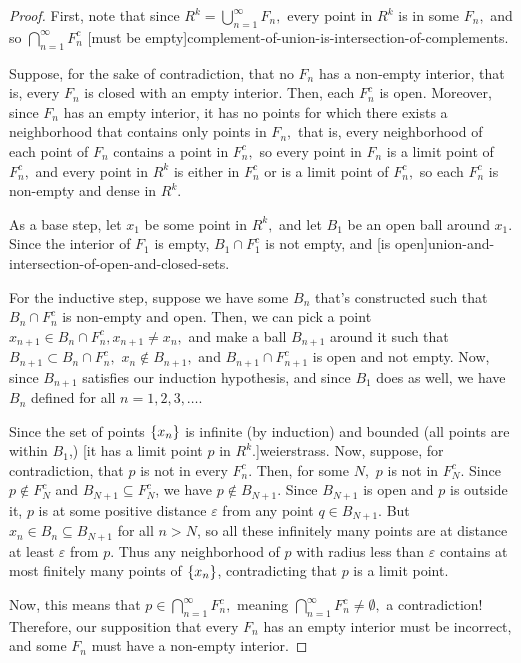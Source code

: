 \documentclass{article}
\begin{document}
\begin{proof}
First, note that since $R^k = \bigcup_{n=1}^{\infty}F_n,$ every point in $R^k$ is in some $F_n,$ and so $\bigcap_{n=1}^\infty F_n^c$ \@[must be empty]{complement-of-union-is-intersection-of-complements}.

Suppose, for the sake of contradiction, that no $F_n$ has a non-empty interior, that is, every $F_n$ is \@{closed} with an empty interior. Then, each $F_n^c$ is open. Moreover, since $F_n$ has an empty interior, it has no points for which there exists a neighborhood that contains only points in $F_n,$ that is, every \@{neighborhood} of each point of $F_n$ contains a point in $F_n^c,$ so every point in $F_n$ is a limit point of $F_n^c,$ and every point in $R^k$ is either in $F_n^c$ or is a limit point of $F_n^c,$ so each $F_n^c$ is non-empty and \@{dense} in $R^k.$

As a base step, let $x_1$ be some point in $R^k,$ and let $B_1$ be an open \@{ball} around $x_1.$ Since the interior of $F_1$ is empty, $B_1 \cap F_1^c$ is not empty, and \@[is open]{union-and-intersection-of-open-and-closed-sets}.

For the inductive step, suppose we have some $B_n$ that's constructed such that $B_n \cap F_n^c$ is non-empty and open. Then, we can pick a point $x_{n+1} \in B_n \cap F_n^c, x_{n+1} \neq x_n,$ and make a ball $B_{n+1}$ around it such that $B_{n+1} \subset B_n \cap F_{n}^c,$ $x_n \notin B_{n+1},$ and $B_{n+1} \cap F_{n+1}^c$ is open and not empty. Now, since $B_{n+1}$ satisfies our induction hypothesis, and since $B_1$ does as well, we have $B_n$ defined for all $n = 1, 2, 3, \dots.$

Since the set of points $\left\{ x_n \right\}$ is \@{infinite} (by induction) and \@{bounded} (all points are within $B_1$,) \@[it has a limit point $p$ in $R^k.$]{weierstrass}. Now, suppose, for contradiction, that $p$ is not in every $F_n^c.$ Then, for some $N,$ $p$ is not in $F_N^c.$ Since $p \notin F_N^c$ and $B_{N+1} \subseteq F_N^c$, we have $p \notin B_{N+1}$. Since $B_{N+1}$ is open and $p$ is outside it, $p$ is at some positive distance $\varepsilon$ from any point $q \in B_{N+1}$. But $x_n \in B_n \subseteq B_{N+1}$ for all $n > N$, so all these infinitely many points are at distance at least $\varepsilon$ from $p$. Thus any neighborhood of $p$ with radius less than $\varepsilon$ contains at most finitely many points of $\left\{ x_n \right\}$, contradicting that $p$ is a limit point.

Now, this means that $p \in \bigcap_{n=1}^\infty F_n^c,$ meaning $\bigcap_{n=1}^\infty F_n^c \neq \emptyset,$ a contradiction! Therefore, our supposition that every $F_n$ has an empty interior must be incorrect, and some $F_n$ must have a non-empty interior.
\end{proof}
\end{document}

